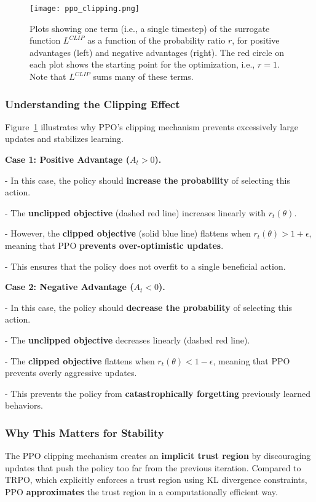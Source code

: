 \documentclass[12pt]{extreport} %
\begin{document}
\begin{figure}[h]
    \centering
    \texttt{[image: ppo\_clipping.png]}
    \caption{Plots showing one term (i.e., a single timestep) of the surrogate function $L^{CLIP}$ as a function of the probability ratio $r$, for positive advantages (left) and negative advantages (right). The red circle on each plot shows the starting point for the optimization, i.e., $r = 1$. Note that $L^{CLIP}$ sums many of these terms.}
    \label{fig:ppo_clipping}
\end{figure}

\subsubsection{Understanding the Clipping Effect}

Figure~\ref{fig:ppo_clipping} illustrates why PPO's clipping mechanism prevents excessively large updates and stabilizes learning. 

\textbf{Case 1: Positive Advantage ($A_t > 0$).}  

- In this case, the policy should \textbf{increase the probability} of selecting this action.

- The \textbf{unclipped objective} (dashed red line) increases linearly with $r_t(\theta)$.

- However, the \textbf{clipped objective} (solid blue line) flattens when $r_t(\theta) > 1 + \epsilon$, meaning that PPO \textbf{prevents over-optimistic updates}.

- This ensures that the policy does not overfit to a single beneficial action.

\textbf{Case 2: Negative Advantage ($A_t < 0$).} 

- In this case, the policy should \textbf{decrease the probability} of selecting this action.

- The \textbf{unclipped objective} decreases linearly (dashed red line).

- The \textbf{clipped objective} flattens when $r_t(\theta) < 1 - \epsilon$, meaning that PPO prevents overly aggressive updates.

- This prevents the policy from \textbf{catastrophically forgetting} previously learned behaviors.

\subsubsection{Why This Matters for Stability}
The PPO clipping mechanism creates an \textbf{implicit trust region} by discouraging updates that push the policy too far from the previous iteration. Compared to TRPO, which explicitly enforces a trust region using KL divergence constraints, PPO \textbf{approximates} the trust region in a computationally efficient way.
\end{document}
